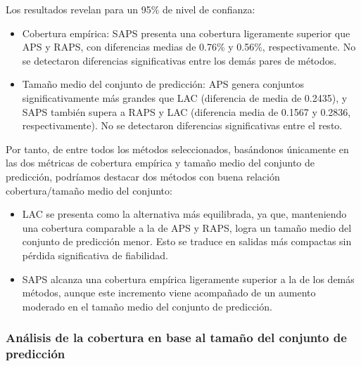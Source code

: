 Los resultados revelan para un 95\% de nivel de confianza:

\begin{itemize}
    
    \item Cobertura empírica: SAPS presenta una cobertura ligeramente superior que APS y RAPS, con diferencias medias de 0.76\% y 0.56\%, respectivamente. No se detectaron diferencias significativas entre los demás pares de métodos.
    
    \item Tamaño medio del conjunto de predicción: APS genera conjuntos significativamente más grandes que LAC (diferencia de media de 0.2435), y SAPS también supera a RAPS y LAC (diferencia media de 0.1567 y 0.2836, respectivamente). No se detectaron diferencias significativas entre el resto. 
    
\end{itemize}

Por tanto, de entre todos los métodos seleccionados, basándonos únicamente en las dos métricas de cobertura empírica y tamaño medio del conjunto de predicción, podríamos destacar dos métodos con buena relación cobertura/tamaño medio del conjunto:

\begin{itemize}
    
    \item LAC se presenta como la alternativa más equilibrada, ya que, manteniendo una cobertura comparable a la de APS y RAPS, logra un tamaño medio del conjunto de predicción menor. Esto se traduce en salidas más compactas sin pérdida significativa de fiabilidad.
    
    \item SAPS alcanza una cobertura empírica ligeramente superior a la de los demás métodos, aunque este incremento viene acompañado de un aumento moderado en el tamaño medio del conjunto de predicción.
    
\end{itemize}

\FloatBarrier


\subsubsection{Análisis de la cobertura en base al tamaño del conjunto de predicción}

